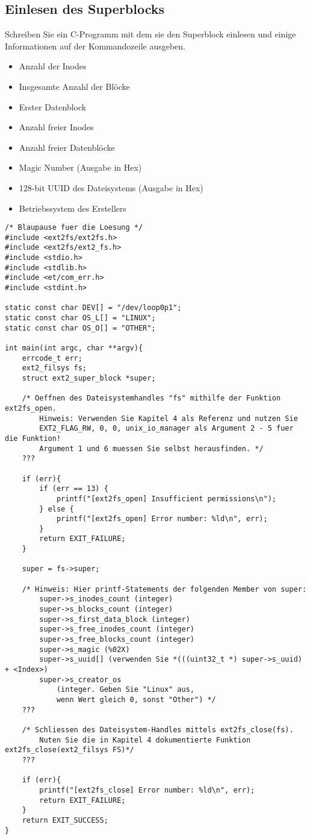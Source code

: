 \documentclass[11pt,a4paper]{article}
\begin{document}
\subsection{Einlesen des Superblocks}
Schreiben Sie ein C-Programm mit dem sie den Superblock einlesen und
einige Informationen auf der Kommandozeile ausgeben. 

\begin{itemize}
	\item Anzahl der Inodes
	\item Insgesamte Anzahl der Blöcke
	\item Erster Datenblock
	\item Anzahl freier Inodes
	\item Anzahl freier Datenblöcke
	\item Magic Number (Ausgabe in Hex)
	\item 128-bit UUID des Dateisystems (Ausgabe in Hex)
	\item Betriebssystem des Erstellers
\end{itemize}

\begin{lstlisting}[style=c]
/* Blaupause fuer die Loesung */
#include <ext2fs/ext2fs.h>
#include <ext2fs/ext2_fs.h>
#include <stdio.h>
#include <stdlib.h>
#include <et/com_err.h>
#include <stdint.h>

static const char DEV[] = "/dev/loop0p1";
static const char OS_L[] = "LINUX";
static const char OS_O[] = "OTHER";

int main(int argc, char **argv){
	errcode_t err;
	ext2_filsys fs;
	struct ext2_super_block *super;

	/* Oeffnen des Dateisystemhandles "fs" mithilfe der Funktion ext2fs_open.
		Hinweis: Verwenden Sie Kapitel 4 als Referenz und nutzen Sie
		EXT2_FLAG_RW, 0, 0, unix_io_manager als Argument 2 - 5 fuer die Funktion!
		Argument 1 und 6 muessen Sie selbst herausfinden. */
	??? 

	if (err){
		if (err == 13) {
			printf("[ext2fs_open] Insufficient permissions\n");
		} else {
			printf("[ext2fs_open] Error number: %ld\n", err);
		}
		return EXIT_FAILURE;
	}
	
	super = fs->super;	

	/* Hinweis: Hier printf-Statements der folgenden Member von super:
		super->s_inodes_count (integer)
		super->s_blocks_count (integer)
		super->s_first_data_block (integer)
		super->s_free_inodes_count (integer)
		super->s_free_blocks_count (integer)
		super->s_magic (%02X)
		super->s_uuid[] (verwenden Sie *(((uint32_t *) super->s_uuid) + <Index>)
		super->s_creator_os 
			(integer. Geben Sie "Linux" aus, 
			wenn Wert gleich 0, sonst "Other") */
	???

	/* Schliessen des Dateisystem-Handles mittels ext2fs_close(fs). 
		Nuten Sie die in Kapitel 4 dokumentierte Funktion ext2fs_close(ext2_filsys FS)*/
	???

	if (err){
		printf("[ext2fs_close] Error number: %ld\n", err);
		return EXIT_FAILURE;
	}
	return EXIT_SUCCESS;
}
\end{lstlisting}
\end{document}
